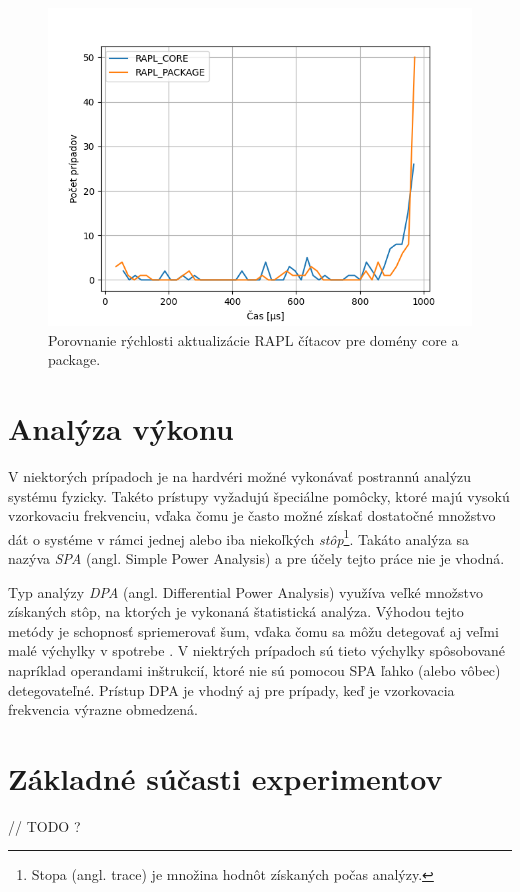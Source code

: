 \begin{figure}\label{img:rapl_refresh}
  \centering
  \includegraphics[scale=0.7]{./obrazky-figures/rapl_refresh_rate.png}
  \caption{Porovnanie rýchlosti aktualizácie RAPL čítacov pre domény core a package.}
\end{figure}

\section{Analýza výkonu}
V niektorých prípadoch je na hardvéri možné vykonávať postrannú analýzu systému fyzicky. Takéto prístupy vyžadujú špeciálne pomôcky,
ktoré majú vysokú vzorkovaciu frekvenciu, vďaka čomu je často možné získať dostatočné množstvo dát o systéme v rámci jednej alebo
iba niekoľkých \emph{stôp}\footnote{Stopa (angl. trace) je množina hodnôt získaných počas analýzy.}.
Takáto analýza sa nazýva \emph{SPA} (angl. Simple Power Analysis) a pre účely tejto práce nie je vhodná.

Typ analýzy \emph{DPA} (angl. Differential Power Analysis) využíva veľké množstvo získaných stôp, na ktorých je vykonaná štatistická analýza.
Výhodou tejto metódy je schopnosť spriemerovať šum, vďaka čomu sa môžu detegovať aj veľmi malé výchylky v spotrebe \cite{Platypus}. V niektrých prípadoch sú tieto
výchylky spôsobované napríklad operandami inštrukcií, ktoré nie sú pomocou SPA ľahko (alebo vôbec) detegovateľné. Prístup DPA je vhodný aj pre
prípady, keď je vzorkovacia frekvencia výrazne obmedzená.


\section{Základné súčasti experimentov}
// TODO ?

